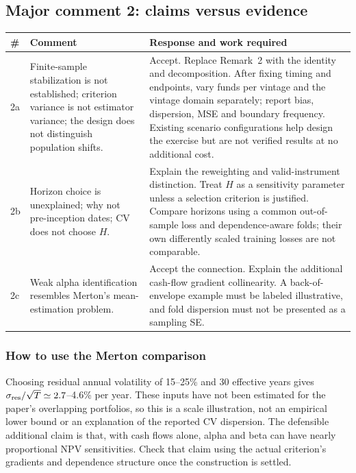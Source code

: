 \documentclass[11pt]{article}
\theoremstyle{plain}
\theoremstyle{definition}
\begin{document}
\subsection{Major comment 2: claims versus evidence}
{\small
\begin{longtable}{@{}L{0.7cm}L{4.6cm}L{10.0cm}@{}}
\toprule
\# & Comment & Response and work required\\
\midrule
\endhead
2a & Finite-sample stabilization is not established; criterion variance is not estimator variance; the design does not distinguish population shifts. & Accept. Replace Remark~2 with the identity and decomposition. After fixing timing and endpoints, vary funds per vintage and the vintage domain separately; report bias, dispersion, MSE and boundary frequency. Existing scenario configurations help design the exercise but are not verified results at no additional cost.\\
2b & Horizon choice is unexplained; why not pre-inception dates; CV does not choose $H$. & Explain the reweighting and valid-instrument distinction. Treat $H$ as a sensitivity parameter unless a selection criterion is justified. Compare horizons using a common out-of-sample loss and dependence-aware folds; their own differently scaled training losses are not comparable.\\
2c & Weak alpha identification resembles Merton's mean-estimation problem. & Accept the connection. Explain the additional cash-flow gradient collinearity. A back-of-envelope example must be labeled illustrative, and fold dispersion must not be presented as a sampling SE.\\
\bottomrule
\end{longtable}
}

\subsubsection{How to use the Merton comparison}
\label{sec:merton}

Choosing residual annual volatility of 15--25\% and 30 effective years gives $\sigma_{\rm res}/\sqrt{T}\simeq2.7$--4.6\% per year. These inputs have not been estimated for the paper's overlapping portfolios, so this is a scale illustration, not an empirical lower bound or an explanation of the reported CV dispersion. The defensible additional claim is that, with cash flows alone, alpha and beta can have nearly proportional NPV sensitivities. Check that claim using the actual criterion's gradients and dependence structure once the construction is settled.
\end{document}
